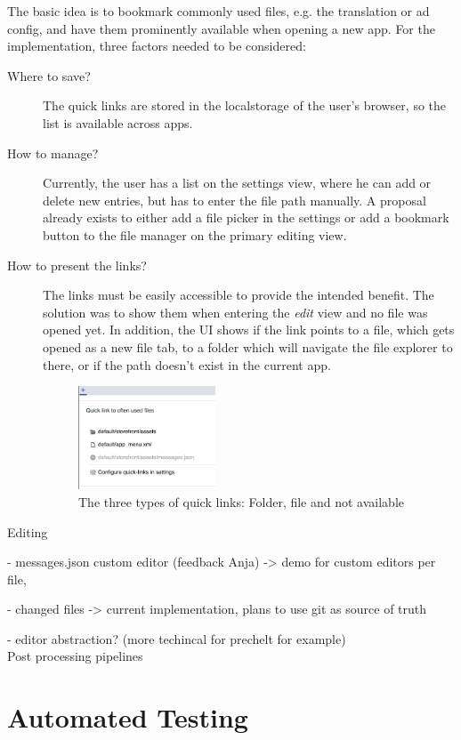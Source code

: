 The basic idea is to bookmark commonly used files, e.g. the translation or ad config, and have them prominently available when opening a new app.
For the implementation, three factors needed to be considered:
\begin{description}
  \item[Where to save?] The quick links are stored in the \Gls{localstorage} of the user's browser, so the list is available across apps.
  \item[How to manage?] Currently, the user has a list on the settings view, where he can add or delete new entries, but has to enter the file path manually.
  A proposal already exists to either add a file picker in the settings or add a bookmark button to the file manager on the primary editing view.
  \item[How to present the links?] The links must be easily accessible to provide the intended benefit. The solution was to show them when entering the \textit{edit} view and no file was opened yet.
  In addition, the UI shows if the link points to a file, which gets opened as a new file tab, to a folder which will navigate the file explorer to there, or if the path doesn't exist in the current app.
  \begin{figure}[h!]
    \centering
    \includegraphics[width=0.4\textwidth]{pics/quick_links.png}
    \caption{The three types of quick links: Folder, file and not available}
  \end{figure}
\end{description}


Editing

- messages.json custom editor (feedback Anja) -> demo for custom editors per file, 

- changed files -> current implementation, plans to use git as source of truth

- editor abstraction? (more techincal for prechelt for example)
\\
Post processing pipelines


\section{Automated Testing}
\label{sec:automated-testing}

